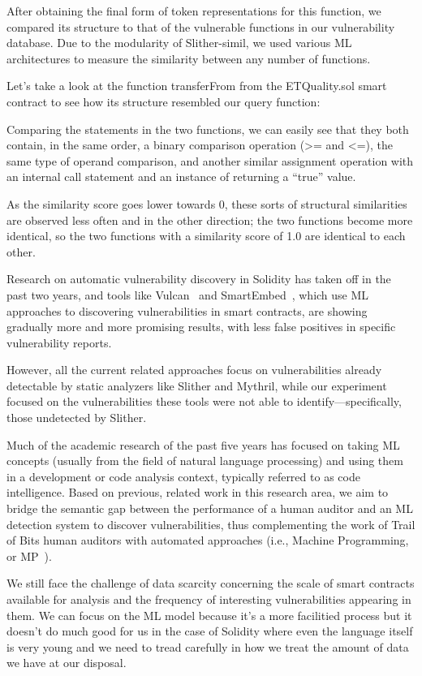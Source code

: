 After obtaining the final form of token representations for this function, we compared its structure to that of the vulnerable functions in our vulnerability database.
Due to the modularity of Slither-simil, we used various ML architectures to measure the similarity between any number of functions.

Let's take a look at the function transferFrom from the ETQuality.sol smart contract to see how its structure resembled our query function:

Comparing the statements in the two functions, we can easily see that they both contain, in the same order, a binary comparison operation (>= and <=), the same type of operand comparison,
and another similar assignment operation with an internal call statement and an instance of returning a “true” value.

As the similarity score goes lower towards 0, these sorts of structural similarities are observed less often and in the other direction; the two functions become more identical, so the two
functions with a similarity score of 1.0 are identical to each other.

Research on automatic vulnerability discovery in Solidity has taken off in the past two years, and tools like Vulcan~\cite{srikant2020vulcan} and SmartEmbed~\cite{gao2019smartembed},
which use ML approaches to discovering vulnerabilities in
smart contracts, are showing gradually more and more promising results, with less false positives in specific vulnerability reports.

However, all the current related approaches focus on vulnerabilities already detectable by static analyzers like Slither and Mythril, while our experiment focused on the vulnerabilities these
tools were not able to identify—specifically, those undetected by Slither.

Much of the academic research of the past five years has focused on taking ML concepts (usually from the field of natural language processing) and using them in a development or code analysis context,
typically referred to as code intelligence.
Based on previous, related work in this research area, we aim to bridge the semantic gap between the performance of a human auditor and an ML detection system to discover vulnerabilities, thus
complementing the work of Trail of Bits human auditors with automated approaches (i.e., Machine Programming, or MP~\cite{gottschlich2018three}).

We still face the challenge of data scarcity concerning the scale of smart contracts available for analysis and the frequency of interesting vulnerabilities appearing in them.
We can focus on the ML model because it's a more facilitied process but it doesn't do much good for us in the case of Solidity where even the language itself is very young and we need to
tread carefully in how we treat the amount of data we have at our disposal.

